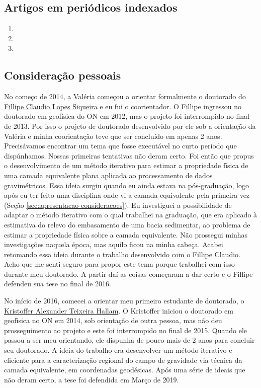 \subsection*{Artigos em periódicos indexados}

\begin{enumerate}
	\item {}
	\item {}
	\item {}
\end{enumerate}

\subsection*{Consideração pessoais}

No começo de 2014, a Valéria começou a orientar formalmente o doutorado do 
\href{https://lattes.cnpq.br/0467623470950142}{Fillipe Claudio Lopes Siqueira} 
e eu fui o coorientador. 
O Fillipe ingressou no doutorado em geofísica do ON em 2012, mas o projeto foi interrompido
no final de 2013. Por isso o projeto de doutorado desenvolvido por ele sob a orientação da 
Valéria e minha coorientação teve que ser concluído em apenas 2 anos.
Precisávamos encontrar um tema que fosse executável no curto período que dispúnhamos. 
Nossas primeiras tentativas não deram certo. Foi então que propus o desenvolvimento de 
um método
iterativo para estimar a propriedade física de uma camada equivalente plana aplicada ao
processamento de dados gravimétricos.
Essa ideia surgiu quando eu ainda estava na pós-graduação, logo após eu ter feito uma
disciplina onde vi a camada equivalente pela primeira vez 
(Seção \ref{sec:apresentacao-consideracoes}). Eu investiguei a possibilidade de adaptar o
método iterativo com o qual trabalhei na graduação, que era aplicado à estimativa do relevo
do embasamento de uma bacia sedimentar, ao problema de estimar a propriedade física sobre a 
camada equivalente. Não prossegui minhas investigações naquela época, mas aquilo ficou 
na minha cabeça. Acabei retomando essa ideia durante o trabalho desenvolvido 
com o Fillipe Claudio. Acho que me senti seguro para propor este tema porque trabalhei
com isso durante meu doutorado. A partir daí as coisas começaram a dar certo e o Fillipe
defendeu sua tese no final de 2016.

No início de 2016, comecei a orientar meu primeiro estudante de doutorado,
o \href{https://lattes.cnpq.br/1185423367238423}{Kristoffer Alexander Teixeira Hallam}.
O Kristoffer iniciou o doutorado em geofísica no ON em 2014, sob orientação de outra pessoa,
mas não deu prosseguimento ao projeto e este foi interrompido no final de 2015. 
Quando ele passou a ser meu orientando, ele dispunha de pouco mais de 2 anos para concluir
seu doutorado. A ideia do trabalho era desenvolver um método iterativo e eficiente 
para a caracterização regional do campo de gravidade via técnica da camada equivalente, 
em coordenadas geodésicas. 
Após uma série de ideais que não deram certo, a tese foi defendida em Março de 2019.


